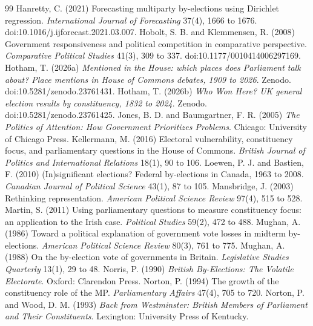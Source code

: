 \documentclass[11pt,a4paper]{article}
\begin{document}
\begin{thebibliography}{99}
 Hanretty, C. (2021) Forecasting multiparty by-elections using Dirichlet regression. \textit{International Journal of Forecasting} 37(4), 1666 to 1676. doi:10.1016/j.ijforecast.2021.03.007.
 Hobolt, S. B. and Klemmensen, R. (2008) Government responsiveness and political competition in comparative perspective. \textit{Comparative Political Studies} 41(3), 309 to 337. doi:10.1177/0010414006297169.
 Hotham, T. (2026a) \textit{Mentioned in the House: which places does Parliament talk about? Place mentions in House of Commons debates, 1909 to 2026}. Zenodo. doi:10.5281/zenodo.23761431.
 Hotham, T. (2026b) \textit{Who Won Here? UK general election results by constituency, 1832 to 2024}. Zenodo. doi:10.5281/zenodo.23761425.
 Jones, B. D. and Baumgartner, F. R. (2005) \textit{The Politics of Attention: How Government Prioritizes Problems}. Chicago: University of Chicago Press.
 Kellermann, M. (2016) Electoral vulnerability, constituency focus, and parliamentary questions in the House of Commons. \textit{British Journal of Politics and International Relations} 18(1), 90 to 106.
 Loewen, P. J. and Bastien, F. (2010) (In)significant elections? Federal by-elections in Canada, 1963 to 2008. \textit{Canadian Journal of Political Science} 43(1), 87 to 105.
 Mansbridge, J. (2003) Rethinking representation. \textit{American Political Science Review} 97(4), 515 to 528.
 Martin, S. (2011) Using parliamentary questions to measure constituency focus: an application to the Irish case. \textit{Political Studies} 59(2), 472 to 488.
 Mughan, A. (1986) Toward a political explanation of government vote losses in midterm by-elections. \textit{American Political Science Review} 80(3), 761 to 775.
 Mughan, A. (1988) On the by-election vote of governments in Britain. \textit{Legislative Studies Quarterly} 13(1), 29 to 48.
 Norris, P. (1990) \textit{British By-Elections: The Volatile Electorate}. Oxford: Clarendon Press.
 Norton, P. (1994) The growth of the constituency role of the MP. \textit{Parliamentary Affairs} 47(4), 705 to 720.
 Norton, P. and Wood, D. M. (1993) \textit{Back from Westminster: British Members of Parliament and Their Constituents}. Lexington: University Press of Kentucky.

\end{thebibliography}
\end{document}
